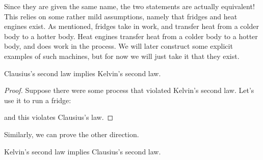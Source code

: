 \documentclass[a4paper]{article}
\begin{document}
Since they are given the same name, the two statements are actually equivalent! This relies on some rather mild assumptions, namely that fridges and heat engines exist. As mentioned, fridges take in work, and transfer heat from a colder body to a hotter body. Heat engines transfer heat from a colder body to a hotter body, and does work in the process. We will later construct some explicit examples of such machines, but for now we will just take it that they exist.

\begin{prop}
  Clausius's second law implies Kelvin's second law.
\end{prop}

\begin{proof}
  Suppose there were some process that violated Kelvin's second law. Let's use it to run a fridge:
  \begin{center}
  \end{center}
  and this violates Clausius's law.
\end{proof}

Similarly, we can prove the other direction.
\begin{prop}
  Kelvin's second law implies Clausius's second law.
\end{prop}
\end{document}
